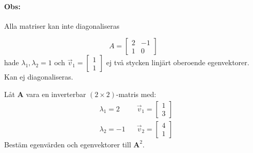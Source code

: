 \paragraph{Obs:} %
\label{par:obs_}
Alla matriser kan inte diagonaliseras
\begin{Ex}
	\[
	A = \begin{bmatrix} 2 & -1\\1&0 \end{bmatrix}
	\]
	hade $\lambda_1, \lambda_2 = 1$ och $\vec{v}_1 = \begin{bmatrix} 1\\1 \end{bmatrix}$ ej två stycken linjärt oberoende egenvektorer. Kan ej diagonaliseras. 
\end{Ex}
\begin{Ex}
	Låt \textbf{A} vara en inverterbar $(2 \times 2)$-matris med:
	\begin{align*}
	&\lambda_1 = 2 &&\vec{v}_1 = \begin{bmatrix} 1\\3 \end{bmatrix}\\
	&\lambda_2 = -1 &&\vec{v}_2 = \begin{bmatrix} 4\\1 \end{bmatrix}
	\end{align*}
	Bestäm egenvärden och egenvektorer till $\mathbf{A}^2$.

\end{Ex}
